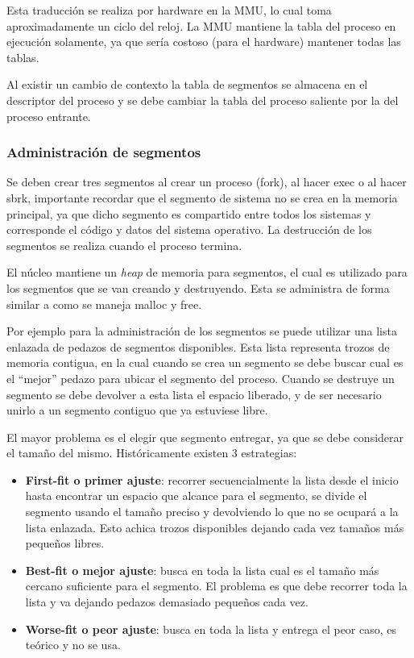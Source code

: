 Esta traducción se realiza por hardware en la MMU, lo cual toma aproximadamente
un ciclo del reloj. La MMU mantiene la tabla del proceso en ejecución solamente,
ya que sería costoso (para el hardware) mantener todas las tablas.

Al existir un cambio de contexto la tabla de segmentos se almacena en el
descriptor del proceso y se debe cambiar la tabla del proceso saliente por la
del proceso entrante.

\subsubsection{Administración de segmentos}

Se deben crear tres segmentos al crear un proceso (fork), al hacer exec o al
hacer sbrk, importante recordar que el segmento de sistema no se crea en la
memoria principal, ya que dicho segmento es compartido entre todos los sistemas
y corresponde el código y datos del sistema operativo. La destrucción de los
segmentos se realiza cuando el proceso termina.

El núcleo mantiene un \textit{heap} de memoria para segmentos, el cual es
utilizado para los segmentos que se van creando y destruyendo. Esta se
administra de forma similar a como se maneja malloc y free.

Por ejemplo para la administración de los segmentos se puede utilizar una lista
enlazada de pedazos de segmentos disponibles. Esta lista representa trozos de
memoria contigua, en la cual cuando se crea un segmento se debe buscar cual es
el ``mejor'' pedazo para ubicar el segmento del proceso. Cuando se destruye un
segmento se debe devolver a esta lista el espacio liberado, y de ser necesario
unirlo a un segmento contiguo que ya estuviese libre.

El mayor problema es el elegir que segmento entregar, ya que se debe considerar
el tamaño del mismo. Históricamente existen 3 estrategias:

\begin{itemize}
	\item \textbf{First-fit o primer ajuste}: recorrer secuencialmente la
lista desde el inicio hasta encontrar un espacio que alcance para el segmento,
se divide el segmento usando el tamaño preciso y devolviendo lo que no se
ocupará a la lista enlazada. Esto achica trozos disponibles dejando cada vez
tamaños más pequeños libres.
	\item \textbf{Best-fit o mejor ajuste}: busca en toda la lista cual es
el tamaño más cercano  suficiente para el segmento. El problema es que debe
recorrer toda la lista y va dejando pedazos demasiado pequeños cada vez.
	\item \textbf{Worse-fit o peor ajuste}: busca en toda la lista y entrega
el peor caso, es teórico y no se usa.
\end{itemize}

